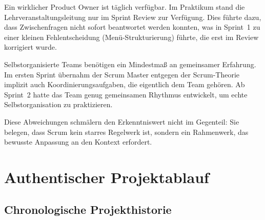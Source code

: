 \documentclass[12pt, a4paper, twoside]{report}
\begin{document}
{\begin{description}[leftmargin=2em, style=nextline]
  \item[Product Owner vs.\ Realität:] Ein wirklicher Product Owner ist täglich verfügbar.
    Im Praktikum stand die Lehrveranstaltungsleitung nur im Sprint Review zur Verfügung.
    Dies führte dazu, dass Zwischenfragen nicht sofort beantwortet werden konnten, was
    in Sprint~1 zu einer kleinen Fehlentscheidung (Menü-Strukturierung) führte, die erst
    im Review korrigiert wurde.

  \item[Selbstorganisation vs.\ Realität:] Selbstorganisierte Teams benötigen ein
    Mindestmaß an gemeinsamer Erfahrung. Im ersten Sprint übernahm der Scrum Master
    \textendash{} entgegen der Scrum-Theorie \textendash{} implizit auch Koordinierungsaufgaben,
    die eigentlich dem Team gehören. Ab Sprint~2 hatte das Team genug gemeinsamen Rhythmus
    entwickelt, um echte Selbstorganisation zu praktizieren.
\end{description}

Diese Abweichungen schmälern den Erkenntniswert nicht \textendash{} im Gegenteil: Sie belegen,
dass Scrum kein starres Regelwerk ist, sondern ein Rahmenwerk, das bewusste Anpassung
an den Kontext erfordert.

\chapter{Authentischer Projektablauf}
\label{chap:ablauf}

\section{Chronologische Projekthistorie}

}
\end{document}
